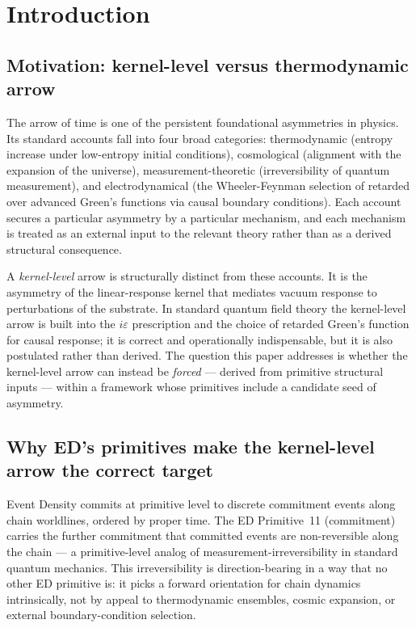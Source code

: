 \documentclass[11pt,a4paper]{article}
\begin{document}
\section{Introduction}

\subsection{Motivation: kernel-level versus thermodynamic arrow}

The arrow of time is one of the persistent foundational asymmetries in physics. Its standard accounts fall into four broad categories: thermodynamic (entropy increase under low-entropy initial conditions), cosmological (alignment with the expansion of the universe), measurement-theoretic (irreversibility of quantum measurement), and electrodynamical (the Wheeler-Feynman selection of retarded over advanced Green's functions via causal boundary conditions). Each account secures a particular asymmetry by a particular mechanism, and each mechanism is treated as an external input to the relevant theory rather than as a derived structural consequence.

A \emph{kernel-level} arrow is structurally distinct from these accounts. It is the asymmetry of the linear-response kernel that mediates vacuum response to perturbations of the substrate. In standard quantum field theory the kernel-level arrow is built into the $i\varepsilon$ prescription and the choice of retarded Green's function for causal response; it is correct and operationally indispensable, but it is also postulated rather than derived. The question this paper addresses is whether the kernel-level arrow can instead be \emph{forced} --- derived from primitive structural inputs --- within a framework whose primitives include a candidate seed of asymmetry.

\subsection{Why ED's primitives make the kernel-level arrow the correct target}

Event Density commits at primitive level to discrete commitment events along chain worldlines, ordered by proper time. The ED Primitive~11 (commitment) carries the further commitment that committed events are non-reversible along the chain --- a primitive-level analog of measurement-irreversibility in standard quantum mechanics. This irreversibility is direction-bearing in a way that no other ED primitive is: it picks a forward orientation for chain dynamics intrinsically, not by appeal to thermodynamic ensembles, cosmic expansion, or external boundary-condition selection.
\end{document}
